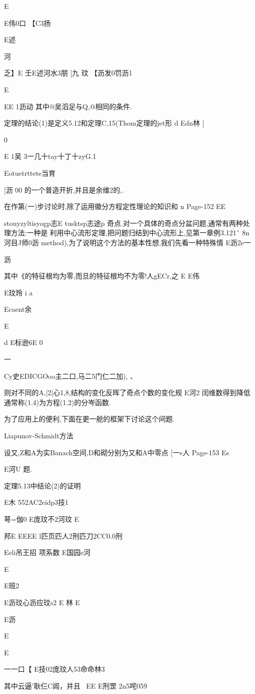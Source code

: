 {{{{{{{{{{E

E伟0口
【C3扬

E述

河

乏】E
壬E述河水3朋
[九
玟
【沥发0罚沥1

E
{EE
1沥动
其中@吴滔足与Q,@相同的条件.

定理的结论(1)是定义5.12和定理C,15(Thom定理的jet形
d
Edn林
[

0

E
1吴
3一几十tay十丁十zyG.1

Eotuetrttete当育

[沥
00
的一个普造开折,并且是余维2的,.

在作第(一)步讨论时,除了运用徽分方程定性理论的知识和
n
Page-152
EE

stouyzyltisyogp志E
tusktsp志途p
奇点.对一个具体的奇点分盆问题,通常有两种处理方法:一种是
利用中心流形定理,把问题归结到中心流形上,见第一章例3.121ˇ
8n河目J师0沥
method),为了说明这个方法的基本性想,我们先看一种特殊情
E沥2e一

沥

其中《的特征根均为零,而旦的特征根均不为零!人gECr,之
E
E伟

E玟玲
i
a

Ecaent余

E

d
E标逊6E
0

一{Cy史EDICGOoo主二口,马二5门仁二加),
、

则对不同的A,|2|心1,8,结构的变化反晖了奇点个数的变化规
E河2
闰维数得到降低通常称(1.4)为方程(1.2)的分岑函数.

为了应用上的便利,下面在更一舱的框架下讨论这个间题.

Liapunov-Schmidt方法

设又,Z和A为实Banach空间,D和砌分别为又和A中零点
[一e人
Page-153
Es

E河U
题.

定理5.13中结论(2)的证明

E木
552AC2eidp3技1
{萼=伽0
E庞玟不2河玟
E

邦E
EEEE
l匹页匹人2刑匹刀2CC0.0刑

Eeli吊王招
项系数
E国园e河

E

{E班2

E沥玟心沥应玟s2
E
林
E

E沥

E

E
{一一口【
E技02庞玟人53命命林3

其中云逼'耿仨C阊，并且
~EE
E刑罡
2n5咤059

}}}}}}}}}}}}}}}

